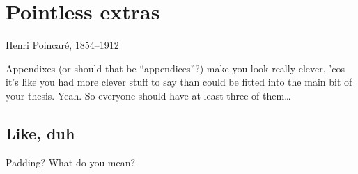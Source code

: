 \chapter{Pointless extras}
\label{app:Pointless}

%
{Henri Poincar\'e, 1854--1912}

Appendixes (or should that be ``appendices''?) make you look really clever, 'cos
it's like you had more clever stuff to say than could be fitted into the main
bit of your thesis. Yeah. So everyone should have at least three of them\dots

\section{Like, duh}
\label{sec:Duh}
Padding? What do you mean?


